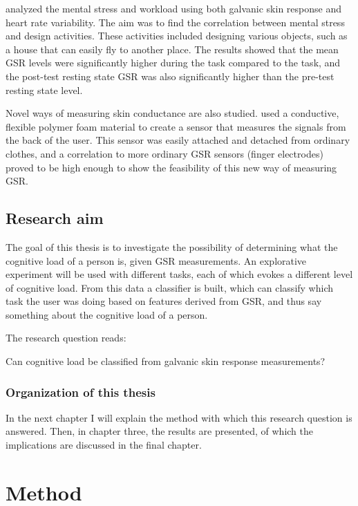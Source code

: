 \documentclass[11pt,leqno,a4paper]{report} %
\begin{document}
\citet{library978540} analyzed the mental stress and workload using both galvanic skin response and heart rate variability. The aim was to find the correlation between mental stress and design activities. These activities included designing various objects, such as a house that can easily fly to another place. The results showed that the mean GSR levels were significantly higher during the task compared to the task, and the post-test resting state GSR was also significantly higher than the pre-test resting state level.

Novel ways of measuring skin conductance are also studied. \citet{A6945148} used a conductive, flexible polymer foam material to create a sensor that measures the signals from the back of the user. This sensor was easily attached and detached from ordinary clothes, and a correlation to more ordinary GSR sensors (finger electrodes) proved to be high enough to show the feasibility of this new way of measuring GSR.


\section{Research aim}
The goal of this thesis is to investigate the possibility of determining what the cognitive load of a person is, given GSR measurements. An explorative experiment will be used with different tasks, each of which evokes a different level of cognitive load. From this data a classifier is built, which can classify which task the user was doing based on features derived from GSR, and thus say something about the cognitive load of a person.

The research question reads:

\begin{center}
Can cognitive load be classified from galvanic skin response measurements?
\end{center}


\subsection{Organization of this thesis}
In the next chapter I will explain the method with which this research question is answered. Then, in chapter three, the results are presented, of which the implications are discussed in the final chapter.

\chapter{Method}
\end{document}
